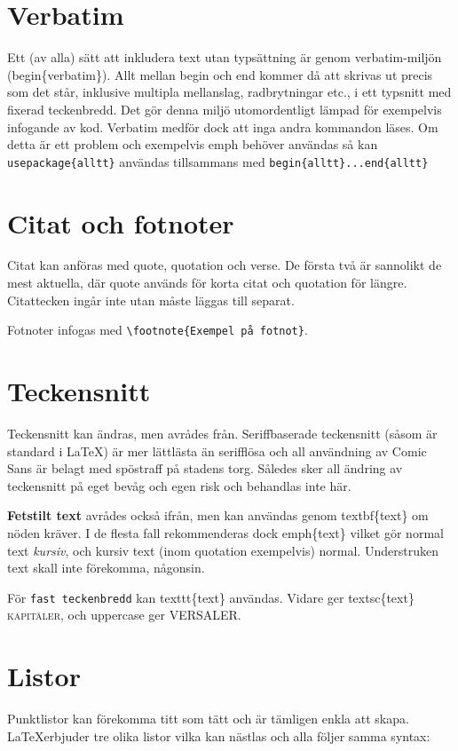 \section{Verbatim}
Ett (av alla) sätt att inkludera text utan typsättning är genom verbatim-miljön (\tb{}begin\{verbatim\}). Allt mellan begin och end kommer då att skrivas ut precis som det står, inklusive multipla mellanslag, radbrytningar etc., i ett typsnitt med fixerad teckenbredd. Det gör denna miljö utomordentligt lämpad för exempelvis infogande av kod. Verbatim medför dock att inga andra kommandon läses. Om detta är ett problem och exempelvis \tb{}emph behöver användas så kan \texttt{\tb{}usepackage\{alltt\}} användas tillsammans med \texttt{\tb{}begin\{alltt\}...\tb{}end\{alltt\}}

\section{Citat och fotnoter}
Citat kan anföras med \tb{}quote, \tb{}quotation och \tb{}verse. De första två är sannolikt de mest aktuella, där \tb{}quote används för korta citat och \tb{}quotation för längre. Citattecken ingår inte utan måste läggas till separat.

Fotnoter infogas med \verb+\footnote{Exempel på fotnot}+.

\section{Teckensnitt}
Teckensnitt kan ändras, men avrådes från. Seriffbaserade teckensnitt (såsom är standard i \LaTeX) är mer lättlästa än serifflösa och all användning av Comic Sans är belagt med spöstraff på stadens torg. Således sker all ändring av teckensnitt på eget bevåg och egen risk och behandlas inte här.

\textbf{Fetstilt text} avrådes också ifrån, men kan användas genom \tb{}textbf\{text\} om nöden kräver. I de flesta fall rekommenderas dock \tb{}emph\{text\} vilket gör normal text \emph{kursiv}, och kursiv text (inom \tb{}quotation exempelvis) normal. Understruken text skall inte förekomma, någonsin.

För \texttt{fast teckenbredd} kan \tb{}texttt\{text\} användas. Vidare ger \tb{}textsc\{text\} \textsc{kapitäler}, och \tb{}uppercase ger \uppercase{versaler}.

\section{Listor}
Punktlistor kan förekomma titt som tätt och är tämligen enkla att skapa. \LaTeX erbjuder tre olika listor vilka kan nästlas och alla följer samma syntax:

